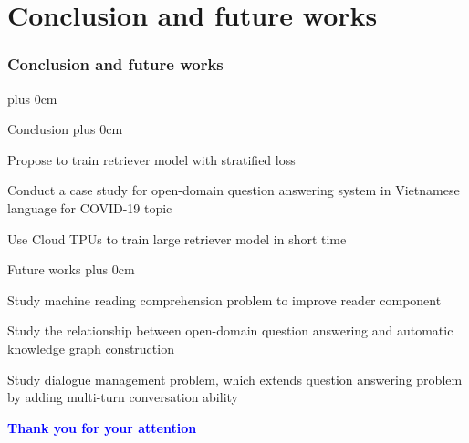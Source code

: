 \documentclass[11pt]{beamer}
\renewcommand{\raggedright}{\leftskip=0pt \rightskip=0pt plus 0cm}
\let\olditemize=\itemize
\renewenvironment{itemize}{\olditemize\raggedright}{\endlist}
\begin{document}
\section{Conclusion and future works}
\begin{frame}
\frametitle{Conclusion and future works}
\begin{center}
	\begin{itemize}
		\item Conclusion
		\begin{itemize}
			\item Propose to train retriever model with stratified loss
			\item Conduct a case study for open-domain question answering system in Vietnamese language for COVID-19 topic
			\item Use Cloud TPUs to train large retriever model in short time
		\end{itemize}
		\item Future works
		\begin{itemize}
			\item Study machine reading comprehension problem to improve reader component
			\item Study the relationship between open-domain question answering and automatic knowledge graph construction
			\item Study dialogue management problem, which extends question answering problem by adding multi-turn conversation ability
		\end{itemize}
	\end{itemize}
\end{center}
\end{frame}
\begin{frame}[plain]
	\begin{center}
		\textcolor{blue}{\fontsize{20pt}{\baselineskip}\selectfont\bfseries Thank you for your attention}
	\end{center}
\end{frame}
\end{document}
